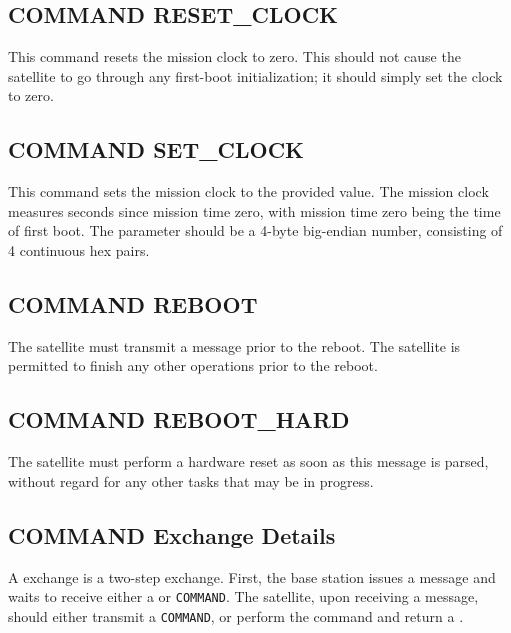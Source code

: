 \documentclass{article}
\begin{document}
  \subsection{COMMAND RESET\_CLOCK}
  This command resets the mission clock to zero. This should not cause the satellite
  to go through any first-boot initialization; it should simply set the clock to zero.
  
  
  \subsection{COMMAND SET\_CLOCK}
  This command sets the mission clock to the provided value. The mission clock measures
  seconds since mission time zero, with mission time zero being the time of first boot.
  The parameter should be a 4-byte big-endian number, consisting of 4 continuous hex
  pairs.
  
  
  \subsection{COMMAND REBOOT}
  The satellite must transmit a \macommand message prior to the reboot. The satellite
  is permitted to finish any other operations prior to the reboot.
  
  
  \subsection{COMMAND REBOOT\_HARD}
  The satellite must perform a hardware reset as soon as this message is parsed, without
  regard for any other tasks that may be in progress.
  
  
  \subsection{COMMAND Exchange Details}
  A \mcommand exchange is a two-step exchange. First, the base station issues a \mcommand message and waits to receive either
  a \macommand or \merror \texttt{COMMAND}. The satellite, upon receiving a \mcommand message, should either transmit a \merror 
  \texttt{COMMAND}, or perform the command and return a \macommand.
  
\end{document}
